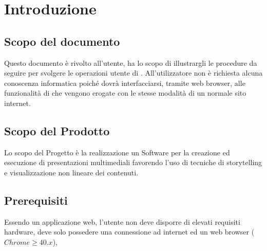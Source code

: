\section{Introduzione}
\subsection{Scopo del documento}
Questo documento è rivolto all’utente, ha lo scopo di illustrargli le procedure da seguire per svolgere le operazioni utente di \premi . All'utilizzatore non è richiesta alcuna conoscenza informatica poiché dovrà interfacciarsi, tramite web browser, alle funzionalità di \premi che vengono erogate con le stesse modalità di un normale sito internet.
\subsection{Scopo del Prodotto}
Lo scopo del Progetto è la realizzazione un Software per la creazione ed esecuzione di presentazioni multimediali favorendo l’uso di tecniche di storytelling e visualizzazione non lineare dei contenuti.
\subsection{Prerequisiti}
\label{sec:prerequisiti}
Essendo \premi un applicazione web, l'utente non deve disporre di elevati requisiti hardware, deve solo possedere una connessione ad internet ed un web browser ($Chrome \geq 40.x$),
